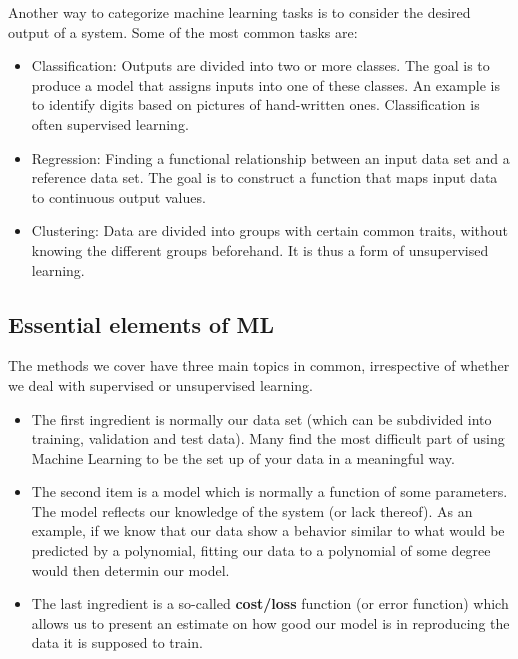 \documentclass[%
oneside,                 %
final,                   %
10pt]{article}
\begin{document}
Another way to categorize machine learning tasks is to consider the
desired output of a system.  Some of the most common tasks are:

\begin{itemize}
\item Classification: Outputs are divided into two or more classes. The goal is to   produce a model that assigns inputs into one of these classes. An example is to identify  digits based on pictures of hand-written ones. Classification is often supervised learning.

\item Regression: Finding a functional relationship between an input data set and a reference data set.   The goal is to construct a function that maps input data to continuous output values.

\item Clustering: Data are divided into groups with certain common traits, without knowing the different groups beforehand.  It is thus a form of unsupervised learning.
\end{itemize}

\noindent



\subsection{Essential elements of ML}

The methods we cover have three main topics in common, irrespective of
whether we deal with supervised or unsupervised learning.
\begin{itemize}
\item The first ingredient is normally our data set (which can be subdivided into training, validation  and test data). Many find the most difficult part of using Machine Learning to be the set up of your data in a meaningful way. 

\item The second item is a model which is normally a function of some parameters.  The model reflects our knowledge of the system (or lack thereof). As an example, if we know that our data show a behavior similar to what would be predicted by a polynomial, fitting our data to a polynomial of some degree would then determin our model. 

\item The last ingredient is a so-called \textbf{cost/loss} function (or error function) which allows us to present an estimate on how good our model is in reproducing the data it is supposed to train.  
\end{itemize}
\end{document}
